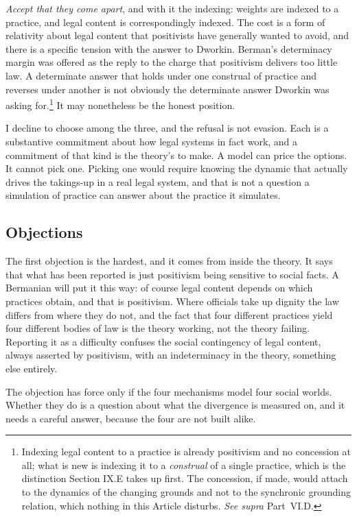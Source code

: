 \textit{Accept that they come apart}, and with it the indexing: weights
are indexed to a practice, and legal content is correspondingly indexed.
The cost is a form of relativity about legal content that positivists have
generally wanted to avoid, and there is a specific tension with the answer
to Dworkin. Berman's determinacy margin was offered as the reply to the charge that
positivism delivers too little law. A determinate
answer that holds under one construal of practice and reverses under
another is not obviously the determinate answer Dworkin was asking
for.\footnote{Indexing legal content to a practice is already positivism
and no concession at all; what is new is indexing it to a \textit{construal}
of a single practice, which is the distinction Section IX.E takes up
first. The concession, if made, would attach to the dynamics of the
changing grounds and not to the synchronic grounding relation, which
nothing in this Article disturbs. \textit{See supra} Part~VI.D.} It may
nonetheless be the honest position.

I decline to choose among the three, and the refusal is not evasion. Each
is a substantive commitment about how legal systems in fact work, and a commitment of that kind is the theory's to make. A model can price the options. It cannot pick one.
Picking one would require knowing the dynamic that actually drives the
takings-up in a real legal system, and that is not a question a simulation
of practice can answer about the practice it simulates.

\subsection{Objections}

The first objection is the hardest, and it comes from inside the theory. It
says that what has been reported is just positivism being sensitive to social
facts. A Bermanian will put it this way: of course legal content depends on
which practices obtain, and that is positivism. Where officials take up dignity the law differs from where they do not, and
the fact that four different practices yield four different bodies of law is
the theory working, not the theory failing. Reporting it as a difficulty
confuses the social contingency of legal content, always asserted by
positivism, with an indeterminacy in the theory, something else entirely.

The objection has force only if the four mechanisms model four social
worlds. Whether they do is a question about what the divergence is measured
on, and it needs a careful answer, because the four are not built alike.

